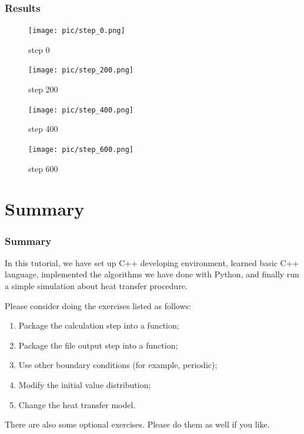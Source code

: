 \documentclass[compress,xcolor={dvipsnames}]{beamer}
\begin{document}
\begin{frame}
    \frametitle{Results}

    \begin{figure}[!h]
        \begin{minipage}{.4\textwidth}
            \texttt{[image: pic/step\_0.png]}
            \centering
            \caption{step 0}
        \end{minipage}\hfil
        \begin{minipage}{.4\textwidth}
            \texttt{[image: pic/step\_200.png]}
            \centering
            \caption{step 200}
        \end{minipage}
    \end{figure}
    \begin{figure}[!h]
        \begin{minipage}{.4\textwidth}
            \texttt{[image: pic/step\_400.png]}
            \centering
            \caption{step 400}
        \end{minipage}\hfil
        \begin{minipage}{.4\textwidth}
            \texttt{[image: pic/step\_600.png]}
            \centering
            \caption{step 600}
        \end{minipage}
    \end{figure}

\end{frame}

\section{Summary}
\begin{frame}
    \frametitle{Summary}

    In this tutorial, we have set up C++ developing environment, learned basic C++ language,
    implemented the algorithms we have done with Python, and finally run a simple simulation about
    heat transfer procedure.

    Please consider doing the exercises listed as follows:
    \begin{enumerate}
        \item Package the calculation step into a function;
        \item Package the file output step into a function;
        \item Use other boundary conditions (for example, periodic);
        \item Modify the initial value distribution;
        \item Change the heat transfer model.
    \end{enumerate}
    There are also some optional exercises. Please do them as well if you like.

\end{frame}
\end{document}

